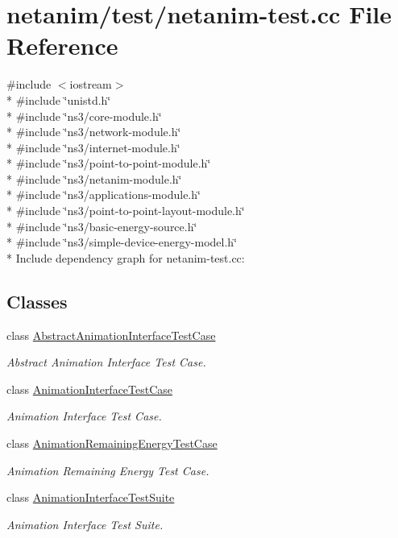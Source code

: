 \hypertarget{netanim-test_8cc}{}\section{netanim/test/netanim-\/test.cc File Reference}
\label{netanim-test_8cc}
{\ttfamily \#include $<$iostream$>$}\\*
{\ttfamily \#include \char`\"{}unistd.\+h\char`\"{}}\\*
{\ttfamily \#include \char`\"{}ns3/core-\/module.\+h\char`\"{}}\\*
{\ttfamily \#include \char`\"{}ns3/network-\/module.\+h\char`\"{}}\\*
{\ttfamily \#include \char`\"{}ns3/internet-\/module.\+h\char`\"{}}\\*
{\ttfamily \#include \char`\"{}ns3/point-\/to-\/point-\/module.\+h\char`\"{}}\\*
{\ttfamily \#include \char`\"{}ns3/netanim-\/module.\+h\char`\"{}}\\*
{\ttfamily \#include \char`\"{}ns3/applications-\/module.\+h\char`\"{}}\\*
{\ttfamily \#include \char`\"{}ns3/point-\/to-\/point-\/layout-\/module.\+h\char`\"{}}\\*
{\ttfamily \#include \char`\"{}ns3/basic-\/energy-\/source.\+h\char`\"{}}\\*
{\ttfamily \#include \char`\"{}ns3/simple-\/device-\/energy-\/model.\+h\char`\"{}}\\*
Include dependency graph for netanim-\/test.cc\+:
\subsection*{Classes}
\begin{DoxyCompactItemize}
\item 
class \hyperlink{classAbstractAnimationInterfaceTestCase}{Abstract\+Animation\+Interface\+Test\+Case}
\begin{DoxyCompactList}\small\item\em Abstract Animation Interface Test Case. \end{DoxyCompactList}\item 
class \hyperlink{classAnimationInterfaceTestCase}{Animation\+Interface\+Test\+Case}
\begin{DoxyCompactList}\small\item\em Animation Interface Test Case. \end{DoxyCompactList}\item 
class \hyperlink{classAnimationRemainingEnergyTestCase}{Animation\+Remaining\+Energy\+Test\+Case}
\begin{DoxyCompactList}\small\item\em Animation Remaining Energy Test Case. \end{DoxyCompactList}\item 
class \hyperlink{classAnimationInterfaceTestSuite}{Animation\+Interface\+Test\+Suite}
\begin{DoxyCompactList}\small\item\em Animation Interface Test Suite. \end{DoxyCompactList}\end{DoxyCompactItemize}
